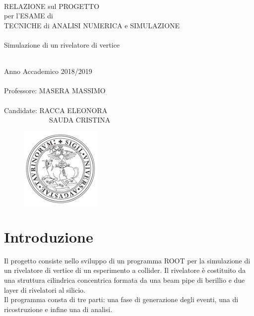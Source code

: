 \documentclass[11pt,a4paper]{article}
\begin{document}
\thispagestyle{empty}

\rmfamily
\begin{center}
\ \\
\vspace{2cm}

\LARGE{\textcolor[rgb]{1,0,0}{RELAZIONE sul PROGETTO\\ per l'ESAME di\\TECNICHE di ANALISI NUMERICA e SIMULAZIONE}\\}
\huge{\textcolor[rgb]{1,0,0}{\ \\Simulazione di un rivelatore di vertice}\\}
\hrulefill \\
\vspace{1.5cm}

\Large{Anno Accademico 2018/2019
\\ \ \\
Professore: MASERA MASSIMO
\\ \ \\ 
Candidate: RACCA ELEONORA\\
\ \ \ \ \ \ \ \ \ \ \ \ \ SAUDA CRISTINA}

\vspace{6cm}
\begin{figure}[h]
\centering
	\includegraphics[width=0.35\textwidth]{logounito.pdf}
\end{figure}

\end{center}

\section{Introduzione}
\par Il progetto consiste nello sviluppo di un programma ROOT per la simulazione di un rivelatore di vertice di un esperimento a collider. Il rivelatore è costituito da una struttura cilindrica concentrica formata da una beam pipe di berillio e due layer di rivelatori al silicio.\\
Il programma consta di tre parti: una fase di generazione degli eventi, una di ricostruzione e infine una di analisi.
\end{document}

